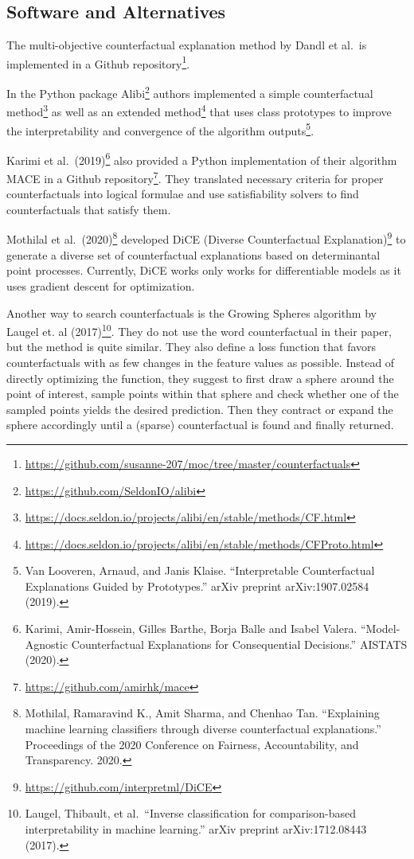 \documentclass[
  12pt,
]{krantz}
\renewcommand{\href}[2]{#2\footnote{\url{#1}}}
\begin{document}
\hypertarget{example-software}{%
\subsection{Software and Alternatives}\label{example-software}}

The multi-objective counterfactual explanation method by Dandl et al.~is implemented in a \href{https://github.com/susanne-207/moc/tree/master/counterfactuals}{Github repository}.

In the Python package \href{https://github.com/SeldonIO/alibi}{Alibi} authors implemented a \href{https://docs.seldon.io/projects/alibi/en/stable/methods/CF.html}{simple counterfactual method} as well as an \href{https://docs.seldon.io/projects/alibi/en/stable/methods/CFProto.html}{extended method} that uses class prototypes to improve the interpretability and convergence of the algorithm outputs\footnote{Van Looveren, Arnaud, and Janis Klaise. ``Interpretable Counterfactual Explanations Guided by Prototypes.'' arXiv preprint arXiv:1907.02584 (2019).}.

Karimi et al.~(2019)\footnote{Karimi, Amir-Hossein, Gilles Barthe, Borja Balle and Isabel Valera. ``Model-Agnostic Counterfactual Explanations for Consequential Decisions.'' AISTATS (2020).} also provided a Python implementation of their algorithm MACE in a \href{https://github.com/amirhk/mace}{Github repository}.
They translated necessary criteria for proper counterfactuals into logical formulae and use satisfiability solvers to find counterfactuals that satisfy them.

Mothilal et al.~(2020)\footnote{Mothilal, Ramaravind K., Amit Sharma, and Chenhao Tan. ``Explaining machine learning classifiers through diverse counterfactual explanations.'' Proceedings of the 2020 Conference on Fairness, Accountability, and Transparency. 2020.} developed \href{https://github.com/interpretml/DiCE}{DiCE (Diverse Counterfactual Explanation)} to generate a diverse set of counterfactual explanations based on determinantal point processes. Currently, DiCE works only works for differentiable models as it uses gradient descent for optimization.

Another way to search counterfactuals is the Growing Spheres algorithm by Laugel et. al (2017)\footnote{Laugel, Thibault, et al.~``Inverse classification for comparison-based interpretability in machine learning.'' arXiv preprint arXiv:1712.08443 (2017).}.
They do not use the word counterfactual in their paper, but the method is quite similar.
They also define a loss function that favors counterfactuals with as few changes in the feature values as possible.
Instead of directly optimizing the function, they suggest to first draw a sphere around the point of interest, sample points within that sphere and check whether one of the sampled points yields the desired prediction.
Then they contract or expand the sphere accordingly until a (sparse) counterfactual is found and finally returned.
\end{document}
